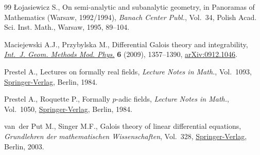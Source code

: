 \begin{thebibliography}{99}
{\L}ojasiewicz S., On semi-analytic and subanalytic geometry, in Panoramas of
 Mathematics ({W}arsaw, 1992/1994), \textit{Banach Center Publ.}, Vol.~34,
 Polish Acad. Sci. Inst. Math., Warsaw, 1995, 89--104.

Maciejewski A.J., Przybylska M., Differential {G}alois theory and
 integrability, \href{https://doi.org/10.1142/S0219887809004272}{\textit{Int.~J. Geom. Methods Mod. Phys.}} \textbf{6} (2009),
 1357--1390, \href{https://arxiv.org/abs/0912.1046}{arXiv:0912.1046}.

Prestel A., Lectures on formally real fields, \textit{Lecture Notes in Math.},
 Vol.~1093, \href{https://doi.org/10.1007/BFb0101548}{Springer-Verlag}, Berlin, 1984.

Prestel A., Roquette P., Formally {$p$}-adic fields, \textit{Lecture Notes in
 Math.}, Vol.~1050, \href{https://doi.org/10.1007/BFb0071461}{Springer-Verlag}, Berlin, 1984.

van~der Put M., Singer M.F., Galois theory of linear differential equations,
 \textit{Grundlehren der mathematischen Wissenschaften}, Vol.~328,
 \href{https://doi.org/10.1007/978-3-642-55750-7}{Springer-Verlag}, Berlin, 2003.

\end{thebibliography}
